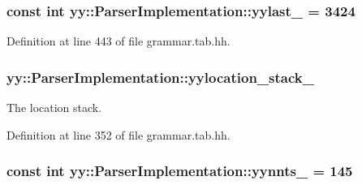 \hypertarget{classyy_1_1_parser_implementation_afd8a2a47960359119acc51fa86ef7a76}{
\subsubsection[{yylast\_\-}]{\setlength{\rightskip}{0pt plus 5cm}const int {\bf yy::ParserImplementation::yylast\_\-} = 3424}}
\label{classyy_1_1_parser_implementation_afd8a2a47960359119acc51fa86ef7a76}


Definition at line 443 of file grammar.tab.hh.

\hypertarget{classyy_1_1_parser_implementation_a43f9699961e4179bc5acaeeb52942502}{
\subsubsection[{yylocation\_\-stack\_\-}]{ {\bf yy::ParserImplementation::yylocation\_\-stack\_\-}}}
\label{classyy_1_1_parser_implementation_a43f9699961e4179bc5acaeeb52942502}


The location stack. 



Definition at line 352 of file grammar.tab.hh.

\hypertarget{classyy_1_1_parser_implementation_aa39f5394c3ec849cf56500b2047aec78}{
\subsubsection[{yynnts\_\-}]{\setlength{\rightskip}{0pt plus 5cm}const int {\bf yy::ParserImplementation::yynnts\_\-} = 145}}
\label{classyy_1_1_parser_implementation_aa39f5394c3ec849cf56500b2047aec78}


